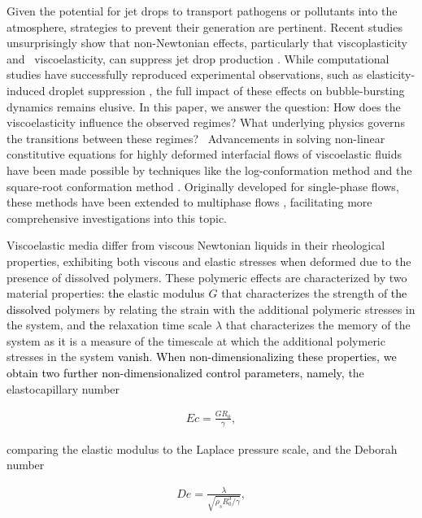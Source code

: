 \documentclass{jfm}
\newcommand{\DL}[1]{{\textcolor{black}{#1}}}
\newcommand{\AO}[1]{{\textcolor{black}{#1}}}
\newcommand{\oo}{\color{black} \normalfont}
\newcommand{\bb}{\color{black} \normalfont}
\begin{document}
Given the potential for jet drops to transport pathogens or pollutants into the atmosphere, strategies to prevent their generation are pertinent. Recent studies unsurprisingly show that non-Newtonian effects, particularly that \oo viscoplasticity and\bb\, viscoelasticity, can suppress jet drop production \citep{sanjay2021bursting, sen2021retraction, rodriguez2023bubble, ji2023secondary}.
While computational studies have successfully reproduced experimental observations, such as elasticity-induced droplet suppression \citep{cabalganteeffect, ari2024bursting}, the full impact of these effects on bubble-bursting dynamics remains elusive. \oo In this paper, we answer the question: How does the viscoelasticity influence the observed regimes? What underlying physics governs the transitions between these regimes?\bb\,
Advancements in solving non-linear constitutive equations for highly deformed interfacial flows of \oo viscoelastic fluids\bb\, have been made possible by techniques like the log-conformation method \citep{fattal2004constitutive} and the square-root conformation method \citep{balci2011symmetric}.
Originally developed for single-phase flows, these methods have been extended to multiphase flows \citep{fraggedakis2016velocity,lopez2019adaptive,varchanis2022numerical,francca2024elasto,zinelis2023transition},
facilitating more comprehensive investigations into this topic.

Viscoelastic media differ from viscous Newtonian liquids in their rheological properties, exhibiting both viscous and elastic stresses when deformed due to the presence of dissolved polymers.
These polymeric effects are characterized by two material properties: \DL{the} elastic modulus $G$ that characterizes the strength of \DL{the dissolved} polymers by relating the strain with the additional polymeric stresses in the system, and \DL{the} relaxation time scale $\lambda$ that characterizes the memory of the system as it is a measure of the timescale at which the additional polymeric stresses in the system \AO{vanish}. \DL{When non-dimensionalizing these properties, we obtain two further non-dimensionalized control parameters, namely,} the elastocapillary number

\begin{align}
	\label{eq:Ecdef}
	Ec = \frac{GR_0}{\gamma},
\end{align}

\noindent comparing the elastic modulus to the Laplace pressure scale\DL{,} and the Deborah number

\begin{align}
	\label{eq:Dedef}
	De = \frac{\lambda}{\sqrt{\rho_sR_0^3/\gamma}},
\end{align}
\end{document}
